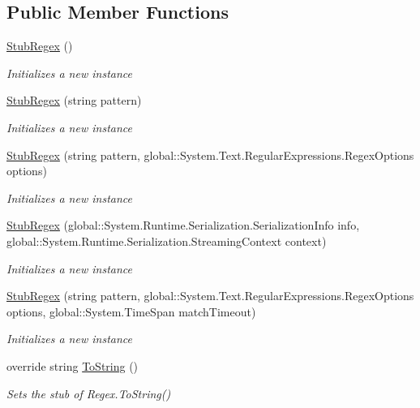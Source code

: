 \subsection*{Public Member Functions}
\begin{DoxyCompactItemize}
\item 
\hyperlink{class_system_1_1_text_1_1_regular_expressions_1_1_fakes_1_1_stub_regex_ade197beaead5f01e194c25d879795b19}{Stub\-Regex} ()
\begin{DoxyCompactList}\small\item\em Initializes a new instance\end{DoxyCompactList}\item 
\hyperlink{class_system_1_1_text_1_1_regular_expressions_1_1_fakes_1_1_stub_regex_a1fe5916dbbde6c7217b13754138a1b82}{Stub\-Regex} (string pattern)
\begin{DoxyCompactList}\small\item\em Initializes a new instance\end{DoxyCompactList}\item 
\hyperlink{class_system_1_1_text_1_1_regular_expressions_1_1_fakes_1_1_stub_regex_a07c3d54c99f49f342fb479bb8dd67085}{Stub\-Regex} (string pattern, global\-::\-System.\-Text.\-Regular\-Expressions.\-Regex\-Options options)
\begin{DoxyCompactList}\small\item\em Initializes a new instance\end{DoxyCompactList}\item 
\hyperlink{class_system_1_1_text_1_1_regular_expressions_1_1_fakes_1_1_stub_regex_a5fdc063576a55d1f074725c746188bf4}{Stub\-Regex} (global\-::\-System.\-Runtime.\-Serialization.\-Serialization\-Info info, global\-::\-System.\-Runtime.\-Serialization.\-Streaming\-Context context)
\begin{DoxyCompactList}\small\item\em Initializes a new instance\end{DoxyCompactList}\item 
\hyperlink{class_system_1_1_text_1_1_regular_expressions_1_1_fakes_1_1_stub_regex_a7166a15e737c946f714d9836d48d1718}{Stub\-Regex} (string pattern, global\-::\-System.\-Text.\-Regular\-Expressions.\-Regex\-Options options, global\-::\-System.\-Time\-Span match\-Timeout)
\begin{DoxyCompactList}\small\item\em Initializes a new instance\end{DoxyCompactList}\item 
override string \hyperlink{class_system_1_1_text_1_1_regular_expressions_1_1_fakes_1_1_stub_regex_a013d44c8e7fd35ccb2e75995e58a3fc4}{To\-String} ()
\begin{DoxyCompactList}\small\item\em Sets the stub of Regex.\-To\-String()\end{DoxyCompactList}\end{DoxyCompactItemize}
